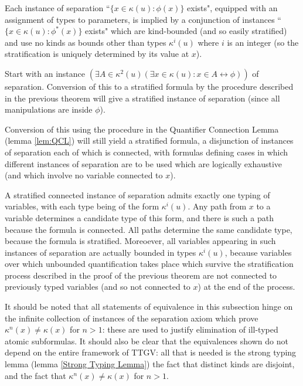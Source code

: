 \documentclass[12pt]{article}
\begin{document}
\begin{thm}\label{thm:kindsep}  Each instance of separation ``$\{x \in \kappa(u):\phi(x)\}$ exists", equipped with an assignment of types to parameters,  is implied by  a conjunction of  instances  ``$\{x \in \kappa(u):\phi^*(x)\}$ exists" which are kind-bounded (and so easily stratified) and use no kinds as bounds other than types $\kappa^i(u)$ where $i$ is an integer (so the stratification is uniquely determined by its value at $x$).\end{thm}


\Proof

Start with an instance $(\exists A \in \kappa^2(u)(\exists x \in \kappa(u):x\in A \leftrightarrow \phi))$ of separation.  Conversion of this to a stratified formula by the procedure described in the previous theorem will give a stratified instance of separation (since all manipulations are inside $\phi$).

Conversion of this using the procedure in the Quantifier Connection Lemma (lemma \ref{lem:QCL}) will still yield a stratified formula, a disjunction of instances of separation each of which is connected, with formulas defining cases in which different instances of separation are to be used which are logically exhaustive (and which involve no variable connected to $x$).

A stratified connected instance of separation admits exactly one typing of variables, with each type being of the form $\kappa^i(u)$.  Any path from $x$ to a variable determines a candidate type of this form, and there is such a path because the formula is connected.  All paths determine the same candidate type, because the formula is
stratified.  Moreoever, all variables appearing in such instances of separation are actually bounded in types $\kappa^i(u)$, because variables over which unbounded quantification takes place which survive the stratification process described in the proof of the previous theorem are not connected to previously typed variables (and so not connected to $x$) at the end of the process.

\endproof

\medskip  It should be noted that all statements of equivalence in this subsection hinge on
the infinite collection of instances of the separation axiom which prove $\kappa^n(x) \neq \kappa(x)$ for $n>1$:  these are used to justify elimination of ill-typed atomic subformulas.  It should also be clear that the equivalences shown do not depend on the entire framework of TTGV:  all that is needed is the strong typing lemma (lemma \ref{Strong Typing Lemma}) the fact that distinct kinds are disjoint, and the fact that $\kappa^n(x) \neq \kappa(x)$ for $n>1$.
\end{document}
